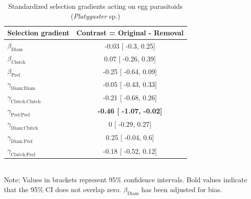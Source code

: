 \documentclass[11pt,]{article}
\begin{document}
\begin{table}[h]
\caption{Standardized selection gradients acting on egg parasitoids (\textit{Platygaster} sp.)}
\label{Table:ExtendedGradients}
\centering
\begin{tabular}{lc}
\\ 
\hline
\textbf{Selection gradient} & \textbf{Contrast = Original - Removal}  \\ 
\hline
$\beta_{\text{Diam}}$ & 

-0.03 [
-0.3,
0.25] \\

$\beta_{\text{Clutch}}$ & 

0.07 [
-0.26,
0.39] \\

$\beta_{\text{Pref}}$ &

-0.25 [
-0.64,
0.09] \\

$\gamma_{\text{Diam:Diam}}$ &

-0.05 [
-0.43,
0.33] \\

$\gamma_{\text{Clutch:Clutch}}$ & 

-0.21 [
-0.68,
0.26] \\

$\gamma_{\text{Pref:Pref}}$ & 

\textbf{
-0.46 [
-1.07,
-0.02] }\\

$\gamma_{\text{Diam:Clutch}}$ & 

0 [
-0.29,
0.27] \\

$\gamma_{\text{Diam:Pref}}$ & 

0.25 [
-0.04,
0.6] \\

$\gamma_{\text{Clutch:Pref}}$ & 

-0.18 [
-0.52,
0.12] \\ 
\hline
\end{tabular}
\bigskip{}
\\
{\footnotesize Note: Values in brackets represent 95\% confidence intervals. Bold values indicate that the 95\% CI does not overlap zero. $\beta_{\text{Diam}}$ has been adjusted for bias.}
\end{table}

\newpage
\end{document}

